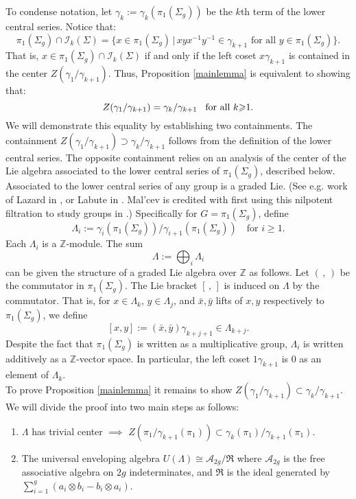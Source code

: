 \documentclass[a4paper]{amsproc}
\theoremstyle{TheoremNum}
\theoremstyle{Theorembold}
\theoremstyle{TheoremboldDef}
\theoremstyle{TheoremboldRem}
\theoremstyle{TheoremboldRem}
\begin{document}
To condense notation, let $\gamma_k:=\gamma_k({\pi_1(\Sigma_g)})$ be the $k$th term of the lower central series. Notice that:
\begin{equation} \label{rewrite}
 {\pi_1(\Sigma_g)}\cap {{\mathcal{I}}_k(\Sigma)} 
=\{x\in{\pi_1(\Sigma_g)}\,|\, xyx^{-1}y^{-1}\in\gamma_{k+1}\text{ for all } y\in {\pi_1(\Sigma_g)}\}.\end{equation}
That is, $x\in{\pi_1(\Sigma_g)}\cap {{\mathcal{I}}_k(\Sigma)}$ if and only if the left coset  $x\gamma_{k+1}$ is contained in the center $Z(\gamma_1/\gamma_{k+1})$. Thus, Proposition \ref{mainlemma} is equivalent to showing that:
\[Z(\gamma_1/\gamma_{k+1})=\gamma_k/\gamma_{k+1}\hspace{.3cm}\text{for all }k{\geqslant} 1.\] We will demonstrate this equality by establishing two containments. The containment $Z(\gamma_1/\gamma_{k+1})\supset \gamma_k/\gamma_{k+1}$ follows from the definition of the lower central series. The opposite containment relies on an analysis of the center of the Lie algebra associated to the lower central series of ${\pi_1(\Sigma_g)}$, described below.\\

Associated to the lower central series of any group is a graded Lie. (See e.g. work of Lazard in \cite{lcs}, or Labute  in \cite{Labute1970}. Mal'cev is credited with first using this nilpotent filtration to study groups in \cite{malcev}.) Specifically for $G={\pi_1(\Sigma_g)}$, define 
\[\Lambda_i:=\gamma_i({\pi_1(\Sigma_g)})/\gamma_{i+1}({\pi_1(\Sigma_g)})\,\,\,\,\text{ for } i{\geqslant} 1. \]  
Each $\Lambda_i$ is a ${\mathbb{Z}}$-module. The sum \[\Lambda:=\bigoplus_i\Lambda_i\] can be given the structure of a graded Lie algebra over ${\mathbb{Z}}$ as follows. Let $(\,,\,)$ be the commutator in ${\pi_1(\Sigma_g)}$.  The Lie bracket $[\, ,\,]$ is induced on $\Lambda$ by the commutator. That is, for $x\in \Lambda_k$, $y\in \Lambda_j$, and $\bar{x},\bar{y}$ lifts of $x, y$ respectively to ${\pi_1(\Sigma_g)}$, we define
\[[x,y]:=(\bar{x},\bar{y})\gamma_{k+j+1}\in\Lambda_{k+j}. \] Despite the fact that ${\pi_1(\Sigma_g)}$ is written as a multiplicative group, $\Lambda_i$ is written additively as a ${\mathbb{Z}}$-vector space. In particular, the left coset $1\gamma_{k+1}$ is $0$ as an element of $\Lambda_k$.\\

To prove Proposition \ref{mainlemma} it remains to show $Z(\gamma_1/\gamma_{k+1})\subset\gamma_k/\gamma_{k+1}$.
 We will divide the proof into two main steps as follows:
 \begin{enumerate}[label=\ref{mainlemma}.\Alph*.]
\item\label{trivialcenter} $\Lambda$ has trivial center $\implies$ $Z(\pi_1/\gamma_{k+1}(\pi_1))\subset \gamma_{k}(\pi_1)/\gamma_{k+1}(\pi_1)$.\\
\item\label{uae} The universal enveloping algebra $U(\Lambda)\cong \mathcal{A}_{2g}/\mathfrak{R}$ where $\mathcal{A}_{2g}$ is the free associative algebra on $2g$ indeterminates, and $\mathfrak{R}$ is the ideal generated by $\sum_{i=1}^g(a_i\otimes b_i-b_i\otimes a_i)$.\end{enumerate}
\end{document}
